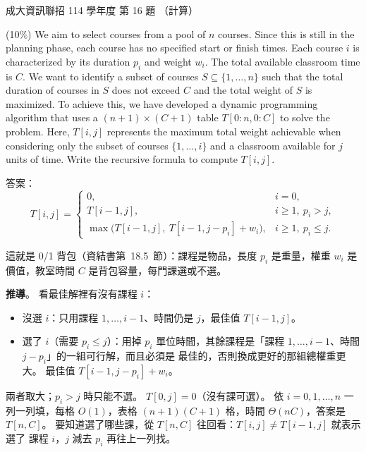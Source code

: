 \begin{pastexam}[label={px:ncku-114-prog-16}]{成大資訊聯招 114 學年度 第 16 題}
（計算）

(10\%) We aim to select courses from a pool of $n$ courses. Since this is still in the planning phase, each course has no specified start or finish times. Each course $i$ is characterized by its duration $p_i$ and weight $w_i$. The total available classroom time is $C$. We want to identify a subset of courses $S\subseteq\{1,\ldots,n\}$ such that the total duration of courses in $S$ does not exceed $C$ and the total weight of $S$ is maximized. To achieve this, we have developed a dynamic programming algorithm that uses a $(n+1)\times(C+1)$ table $T[0{:}n,0{:}C]$ to solve the problem. Here, $T[i,j]$ represents the maximum total weight achievable when considering only the subset of courses $\{1,\ldots,i\}$ and a classroom available for $j$ units of time. Write the recursive formula to compute $T[i,j]$.
\end{pastexam}

\begin{pastsoln}
答案：
\[
T[i, j] =
\begin{cases}
0, & i = 0, \\
T[i-1, j], & i \ge 1,\ p_i > j, \\
\max\bigl(T[i-1, j],\ T[i-1, j - p_i] + w_i\bigr), & i \ge 1,\ p_i \le j .
\end{cases}
\]

這就是 0/1 背包（資結書第~18.5~節）：課程是物品，長度 $p_i$ 是重量，權重 $w_i$ 是價值，教室時間 $C$ 是背包容量，每門課選或不選。

\textbf{推導}。 看最佳解裡有沒有課程 $i$：
\begin{itemize}
\item 沒選 $i$：只用課程 $1, \ldots, i-1$、時間仍是 $j$，最佳值 $T[i-1, j]$。
\item 選了 $i$（需要 $p_i \le j$）：用掉 $p_i$ 單位時間，其餘課程是「課程 $1, \ldots, i-1$、時間 $j - p_i$」的一組可行解，而且必須是
最佳的，否則換成更好的那組總權重更大。 最佳值 $T[i-1, j - p_i] + w_i$。
\end{itemize}
兩者取大；$p_i > j$ 時只能不選。 $T[0, j] = 0$（沒有課可選）。 依 $i = 0, 1, \ldots, n$ 一列一列填，每格 $O(1)$，表格
$(n+1)(C+1)$ 格，時間 $\Theta(nC)$，答案是 $T[n, C]$。 要知道選了哪些課，從 $T[n, C]$ 往回看：$T[i, j] \ne T[i-1, j]$ 就表示選了
課程 $i$，$j$ 減去 $p_i$ 再往上一列找。
\end{pastsoln}

